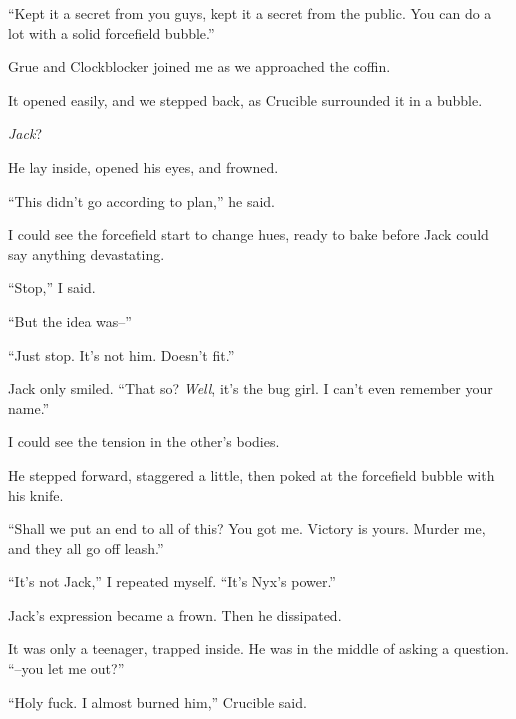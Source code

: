 ``Kept it a secret from you guys, kept it a secret from the public.  You can do a lot with a solid forcefield bubble.''



Grue and Clockblocker joined me as we approached the coffin.



It opened easily, and we stepped back, as Crucible surrounded it in a bubble.



\emph{Jack}?



He lay inside, opened his eyes, and frowned.



``This didn't go according to plan,'' he said.



I could see the forcefield start to change hues, ready to bake before Jack could say anything devastating.



``Stop,'' I said.



``But the idea was--''



``Just stop.  It's not him.  Doesn't fit.''



Jack only smiled.  ``That so?  \emph{Well}, it's the bug girl.  I can't even remember your name.''



I could see the tension in the other's bodies.



He stepped forward, staggered a little, then poked at the forcefield bubble with his knife.



``Shall we put an end to all of this?  You got me.  Victory is yours.  Murder me, and they all go off leash.''



``It's not Jack,'' I repeated myself.  ``It's Nyx's power.''



Jack's expression became a frown.  Then he dissipated.



It was only a teenager, trapped inside.  He was in the middle of asking a question.  ``--you let me out?''



``Holy fuck.  I almost burned him,'' Crucible said.



